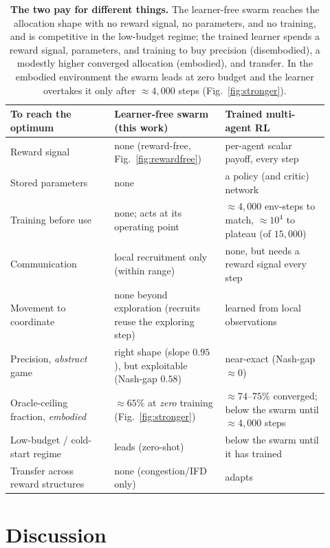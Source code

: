 \documentclass{article}
\begin{document}
\begin{table}[H]
\centering
{\small
\begin{tabular}{@{}p{0.30\linewidth}p{0.32\linewidth}p{0.30\linewidth}@{}}
\hline
\textbf{To reach the optimum} & \textbf{Learner-free swarm (this work)} & \textbf{Trained multi-agent RL} \\
\hline
Reward signal & none (reward-free, Fig.~\ref{fig:rewardfree}) & per-agent scalar payoff, every step \\
Stored parameters & none & a policy (and critic) network \\
Training before use & none; acts at its operating point & ${\approx}4{,}000$ env-steps to match, ${\approx}10^4$ to plateau (of $15{,}000$) \\
Communication & local recruitment only (within range) & none, but needs a reward signal every step \\
Movement to coordinate & none beyond exploration (recruits reuse the exploring step) & learned from local observations \\
Precision, \emph{abstract} game & right shape (slope $0.95$), but exploitable (Nash-gap $0.58$) & near-exact (Nash-gap ${\approx}0$) \\
Oracle-ceiling fraction, \emph{embodied} & ${\approx}65\%$ at \emph{zero} training (Fig.~\ref{fig:stronger}) & ${\approx}74$--$75\%$ converged; below the swarm until ${\approx}4{,}000$ steps \\
Low-budget / cold-start regime & leads (zero-shot) & below the swarm until it has trained \\
Transfer across reward structures & none (congestion/IFD only) & adapts \\
\hline
\end{tabular}}
\caption{\textbf{The two pay for different things.} The learner-free swarm reaches the allocation shape with no
reward signal, no parameters, and no training, and is competitive in the low-budget regime; the trained learner
spends a reward signal, parameters, and training to buy precision (disembodied), a modestly higher converged
allocation (embodied), and transfer. In the embodied environment the swarm leads at zero budget and the learner
overtakes it only after ${\approx}4{,}000$ steps (Fig.~\ref{fig:stronger}).}
\label{tab:cost}
\end{table}

\section{Discussion}
\end{document}
